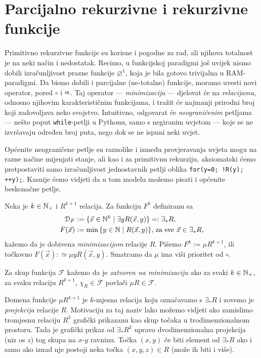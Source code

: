 \section{Parcijalno rekurzivne i rekurzivne funkcije}

Primitivno rekurzivne funkcije su korisne i pogodne za rad, ali njihova totalnost je na neki način i nedostatak. Recimo, u funkcijskoj paradigmi još uvijek nismo dobili izračunljivost prazne funkcije $\varnothing^1$, koja je bila gotovo trivijalna u RAM-paradigmi. Da bismo dobili i parcijalne (ne-totalne) funkcije, moramo uvesti novi operator, pored $\circ$ i $\pr$. Taj operator --- \emph{minimizacija} --- djelovat će na \emph{relacijama}, odnosno njihovim karakterističnim funkcijama, i tražit će najmanji prirodni broj koji zadovoljava neko svojstvo. Intuitivno, odgovarat će \emph{neograničenim} petljama --- nešto poput \texttt{while}-petlji u Pythonu, samo s negiranim uvjetom --- koje se ne izvršavaju određen broj puta, nego dok se ne ispuni neki uvjet.

Općenite neograničene petlje su raznolike i između provjeravanja uvjeta mogu na razne načine mijenjati stanje, ali kao i za primitivnu rekurziju, aksiomatski ćemo pretpostaviti samo izračunljivost jednostavnih petlji oblika
\texttt{for(y=0; !R(y); ++y);}.
Kasnije ćemo vidjeti da u tom modelu možemo pisati i općenite beskonačne petlje.

\begin{definicija}
Neka je $k\in{\mathbb N}_+$ i $R^{k+1}$ relacija. Za funkciju $F^k$ definiranu sa
\begin{align}
    \label{eq:dommu}\mathcal D_{F}&:=\{\vec x\in{\mathbb N}^k\mid\exists yR(\vec x,y)\}=:\exists_*R\text,\\
    F(\vec x)&:=\min\,\{y\in{\mathbb N}\mid R(\vec x,y)\}\text{, za sve $\vec x\in\exists_* R$,}
\end{align}
kažemo da je dobivena \emph{minimizacijom} relacije $R$. Pišemo $F^k:=\mu R^{k+1}$, ili točkovno
$F(\vec x):\simeq\mu yR(\vec x,y)$. Smatramo da $\mu$ ima viši prioritet od $\circ$.

Za skup funkcija $\mathcal F$ kažemo da je \emph{zatvoren na minimizaciju} ako za svaki $k\in{\mathbb N}_+$, za svaku relaciju $R^{k+1}$, $\chi_R\in\mathcal F$ povlači $\mu R\in\mathcal F$. 
\end{definicija}

Domena funkcije $\mu R^{k+1}$ je $k$-mjesna relacija koju označavamo s $\exists_*R$ i zovemo je \emph{projekcija} relacije $R$. Motivaciju za taj naziv lako možemo vidjeti ako zamislimo tromjesnu relaciju $R^3$ grafički prikazanu kao skup točaka u trodimenzionalnom prostoru. Tada je grafički prikaz od $\exists_*R^3$ upravo dvodimenzionalna projekcija (niz os $z$) tog skupa na $x$-$y$ ravninu. Točka $(x,y)$ će biti element od $\exists_*R$ ako i samo ako iznad nje postoji neka točka $(x,y,z)\in R$ (može ih biti i više).

